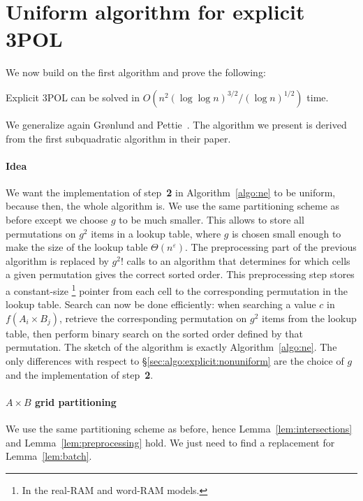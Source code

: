 \section{Uniform algorithm for explicit 3POL}%
\label{sec:algo:explicit:uniform}

We now build on the first algorithm and prove the following:
\begin{theorem}\label{thm:explicit:uniform}
	Explicit 3POL can be solved in
	$O(n^2 {(\log \log n)}^{3/2} / {(\log n)}^{1/2})$ time.
\end{theorem}
We generalize again Gr\o nlund and Pettie~\cite{GP14}. The
algorithm we present is derived from the first subquadratic algorithm in their
paper.

\paragraph{Idea}
We want the implementation of step~\textbf{2} in Algorithm~\ref{algo:ne} to be
uniform, because then, the whole algorithm is.
We use the same partitioning scheme as before except we choose $g$ to be much
smaller.
This allows to
store all permutations on $g^2$ items in a lookup table, where
$g$ is chosen small enough to make the size of the lookup table $\Theta(n^\varepsilon)$.
The preprocessing part of the previous algorithm is replaced by $ g^2! $ calls to
an algorithm that determines for which cells a given permutation gives the
correct sorted
order. This preprocessing step stores a constant-size%
\footnote{In the real-RAM and word-RAM models.}
pointer from each cell to
the corresponding permutation in the lookup table.
Search can now be done efficiently: when searching a value $c$ in $f(A_i
\times B_j)$, retrieve the corresponding permutation on $g^2$ items from the
lookup table,
then perform binary search on the sorted order defined by that permutation.
The sketch of the algorithm is exactly Algorithm~\ref{algo:ne}. The only
differences with respect to \S\ref{sec:algo:explicit:nonuniform} are the choice
of $g$ and the implementation of step~\textbf{2}.

\paragraph{$A \times B$ grid partitioning}
We use the same partitioning scheme as before, hence
Lemma~\ref{lem:intersections} and Lemma~\ref{lem:preprocessing} hold.
We just need to find a replacement for Lemma~\ref{lem:batch}.

